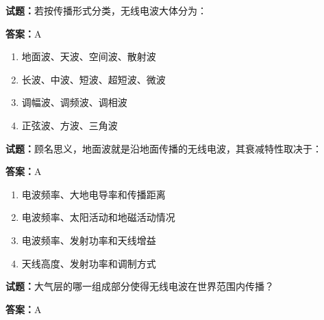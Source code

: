 \documentclass{ctexbook}
\begin{document}




\vspace{1em}

\textbf{试题：}若按传播形式分类，无线电波大体分为： 

\textbf{答案：}A 

\begin{enumerate}[leftmargin=3em]
  \item 地面波、天波、空间波、散射波 

  \item 长波、中波、短波、超短波、微波 

  \item 调幅波、调频波、调相波 

  \item 正弦波、方波、三角波 

\end{enumerate}






\vspace{1em}

\textbf{试题：}顾名思义，地面波就是沿地面传播的无线电波，其衰减特性取决于： 

\textbf{答案：}A 

\begin{enumerate}[leftmargin=3em]
  \item 电波频率、大地电导率和传播距离 

  \item 电波频率、太阳活动和地磁活动情况 

  \item 电波频率、发射功率和天线增益 

  \item 天线高度、发射功率和调制方式 

\end{enumerate}





\vspace{1em}

\textbf{试题：}大气层的哪一组成部分使得无线电波在世界范围内传播？ 

\textbf{答案：}A 
\end{document}

